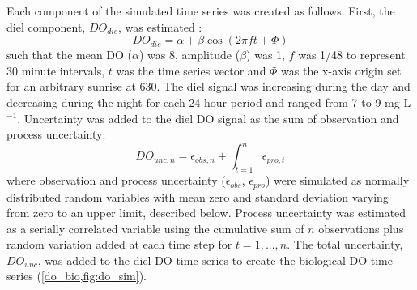 \documentclass[letterpaper,12pt,oneside]{article}\usepackage[]{graphicx}\usepackage[]{color}
\begin{document}
Each component of the simulated time series was created as follows.  First, the diel component, $DO_{die}$, was estimated \citep{Cryer08}:
\begin{equation} \label{do_sin}
DO_{die} = \alpha + \beta\cos\left(2\pi ft + \Phi\right)
\end{equation}
such that the mean DO ($\alpha$) was 8, amplitude ($\beta$) was 1, $f$ was 1/48 to represent 30 minute intervals, $t$ was the time series vector and $\Phi$ was the x-axis origin set for an arbitrary sunrise at 630.  The diel signal was increasing during the day and decreasing during the night for each 24 hour period and ranged from 7 to 9 mg L$^{-1}$.  Uncertainty was added to the diel \ac{DO} signal as the sum of observation and process uncertainty:
\begin{equation} \label{do_unc_n}
DO_{unc, n} = \epsilon_{obs, n} + \int_{t = 1}^{n} \epsilon_{pro, t}
\end{equation}
where observation and process uncertainty ($\epsilon_{obs}$, $\epsilon_{pro}$) were simulated as normally distributed random variables with mean zero and standard deviation varying from zero to an upper limit, described below.  Process uncertainty was estimated as a serially correlated variable using the cumulative sum of $n$ observations plus random variation added at each time step for $t = 1, ..., n$.  The total uncertainty, $DO_{unc}$, was added to the diel \ac{DO} time series to create the biological \ac{DO} time series (\cref{do_bio,fig:do_sim}).
\end{document}

